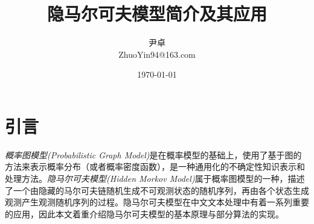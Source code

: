\documentclass[UTF8, 12pt]{ctexart}
\begin{document}
\title{\heiti 隐马尔可夫模型简介及其应用}
\author{\kaishu 尹卓\\ \kaishu ZhuoYin94@163.com}
\date{\today}
\maketitle

\tableofcontents
\newpage
	
\section{引言}
	\emph{概率图模型(Probabilistic Graph Model)}是在概率模型的基础上，使用了基于图的方法来表示概率分布（或者概率密度函数），是一种通用化的不确定性知识表示和处理方法\cite{宗成庆2013统计自然语言处理}。\emph{隐马尔可夫模型(Hidden Morkov Model)}属于概率图模型的一种，描述了一个由隐藏的马尔可夫链随机生成不可观测状态的随机序列，再由各个状态生成观测产生观测随机序列的过程。隐马尔可夫模型在中文文本处理中有着一系列重要的应用，因此本文着重介绍隐马尔可夫模型的基本原理与部分算法的实现。
\end{document}
